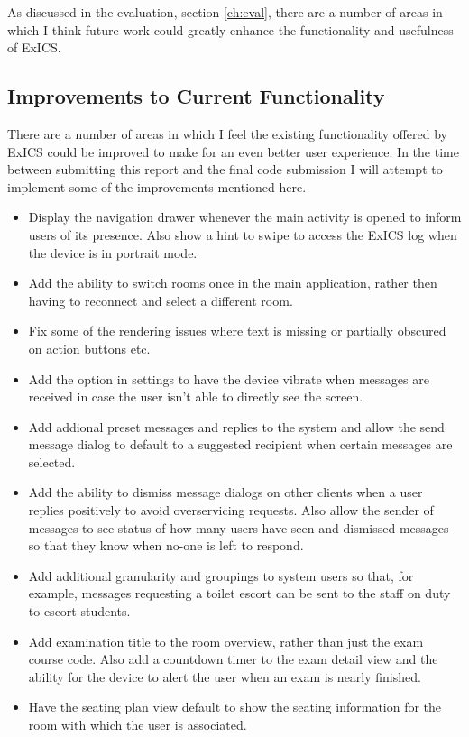 As discussed in the evaluation, section \ref{ch:eval}, there are a number of areas in which I think future work could greatly enhance the functionality and usefulness of ExICS.

\subsection{Improvements to Current Functionality}

There are a number of areas in which I feel the existing functionality offered by ExICS could be improved to make for an even better user experience.  In the time between submitting this report and the final code submission I will attempt to implement some of the improvements mentioned here.

\begin{itemize}

\item Display the navigation drawer whenever the main activity is opened to inform users of its presence.  Also show a hint to swipe to access the ExICS log when the device is in portrait mode.

\item Add the ability to switch rooms once in the main application, rather then having to reconnect and select a different room.

\item Fix some of the rendering issues where text is missing or partially obscured on action buttons etc.

\item Add the option in settings to have the device vibrate when messages are received in case the user isn't able to directly see the screen.

\item Add addional preset messages and replies to the system and allow the send message dialog to default to a suggested recipient when certain messages are selected.

\item Add the ability to dismiss message dialogs on other clients when a user replies positively to avoid overservicing requests.  Also allow the sender of messages to see status of how many users have seen and dismissed messages so that they know when no-one is left to respond.

\item Add additional granularity and groupings to system users so that, for example, messages requesting a toilet escort can be sent to the staff on duty to escort students.

\item Add examination title to the room overview, rather than just the exam course code.  Also add a countdown timer to the exam detail view and the ability for the device to alert the user when an exam is nearly finished.

\item Have the seating plan view default to show the seating information for the room with which the user is associated.

\end{itemize}

